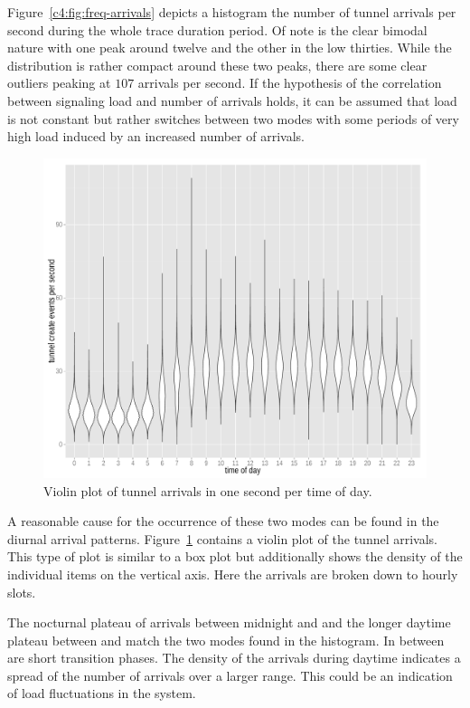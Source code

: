 Figure~\ref{c4:fig:freq-arrivals} depicts a histogram the number of tunnel arrivals per second during the whole trace duration period. Of note is the clear bimodal nature with one peak around twelve and the other in the low thirties. While the distribution is rather compact around these two peaks, there are some clear outliers peaking at $107$ arrivals per second. If the hypothesis of the correlation between signaling load and number of arrivals holds, it can be assumed that load is not constant but rather switches between two modes with some periods of very high load induced by an increased number of arrivals.

\begin{figure}[htb]
	\centering
	\includegraphics[width=1.0\textwidth]{images/R-createspersecond-1h-violin.pdf}
	\caption{Violin plot of tunnel arrivals in one second per time of day.}
\label{c4:fig:freq-arrivals-per-second-violin}
\end{figure}

A reasonable cause for the occurrence of these two modes can be found in the diurnal arrival patterns. Figure~\ref{c4:fig:freq-arrivals-per-second-violin} contains a violin plot of the tunnel arrivals. This type of plot is similar to a box plot but additionally shows the density of the individual items on the vertical axis. Here the arrivals are broken down to hourly slots. 

The nocturnal plateau of arrivals between midnight and  and the longer daytime plateau between  and  match the two modes found in the histogram. In between are short transition phases. The density of the arrivals during daytime indicates a spread of the number of arrivals over a larger range. This could be an indication of load fluctuations in the system.

